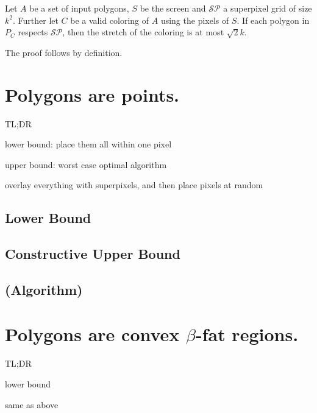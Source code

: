 \documentclass[a4paper, UKenglish]{lipics-v2018}
\newcommand{\spg}{\mathcal{S\!P}}
\begin{document}
\begin{lemma}\label{lem:respect_means_bound}
Let $A$ be a set of input polygons, $S$ be the screen and $\spg$ a superpixel grid of size $k^2$. Further let $C$ be a valid coloring of $A$ using the pixels of $S$.
If each polygon in $P_C$ respects $\spg$, then the stretch of the coloring is at most $\sqrt{2}k$.
\end{lemma}
The proof follows by definition.

\section{Polygons are points.}
\label{sec:points}

TL;DR

lower bound:
place them all within one pixel

upper bound: worst case optimal algorithm

overlay everything with superpixels, and then place pixels at random

\subsection{Lower Bound}
\label{sub:points_lower}




\subsection{Constructive Upper Bound}
\label{sub:points_upper}




\subsection{(Algorithm)}
\label{sub:points_algo}







\section{Polygons are convex $\beta$-fat regions.}
\label{sec:fat}
TL;DR

lower bound

same as above
\end{document}
